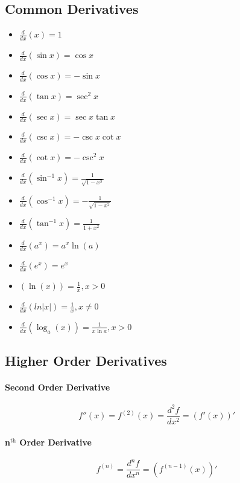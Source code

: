 \documentclass[a4paper, 10pt]{article}
\begin{document}
\subsection{Common Derivatives}
\begin{multicols}{2}
    \begin{itemize}
        \item[] \( \frac{d}{dx}(x) = 1 \)
        \item[] \( \frac{d}{dx}(\sin{x}) = \cos{x} \)
        \item[] \( \frac{d}{dx}(\cos{x}) = -\sin{x} \)
        \item[] \( \frac{d}{dx}(\tan{x}) = \sec^2x \)
        \item[] \( \frac{d}{dx}(\sec x) = \sec x\tan x \)
        \item[] \( \frac{d}{dx}(\csc x) = -\csc x\cot x \)
        \item[] \( \frac{d}{dx}(\cot x) = -\csc^2 x \)
        \item[] \( \frac{d}{dx}\left(\sin^{-1}x\right) = \frac{1}{\sqrt{1-x^2}} \)
        \item[] \( \frac{d}{dx}\left(\cos^{-1}x\right) = -\frac{1}{\sqrt{1-x^2}} \)
        \item[] \( \frac{d}{dx}\left(\tan^{-1}x\right) = \frac{1}{1+x^2} \)
        \item[] \( \frac{d}{dx}\left(a^x\right) = a^x\ln(a) \)
        \item[]  \( \frac{d}{dx}\left(e^x\right) = e^x \)
        \item[] \( \left(\ln(x)\right) = \frac{1}{x}, x > 0 \)
        \item[] \( \frac{d}{dx}(ln\lvert x\rvert) = \frac{1}{x}, x\neq0 \)
        \item[] \( \frac{d}{dx}\left(\log_a(x)\right) = \frac{1}{x\ln a}, x > 0 \)
    \end{itemize}
\end{multicols}
\subsection{Higher Order Derivatives}
\paragraph{Second Order Derivative}
\[ f''(x) = f^{(2)}(x) = \frac{d^2f}{dx^2} = \left(f'(x)\right)' \]
\paragraph{n\(^{\mathrm{th}}\) Order Derivative}
\[ f^{(n)} = \frac{d^nf}{dx^n} = \left(f^{(n-1)}(x)\right)' \]
\end{document}

